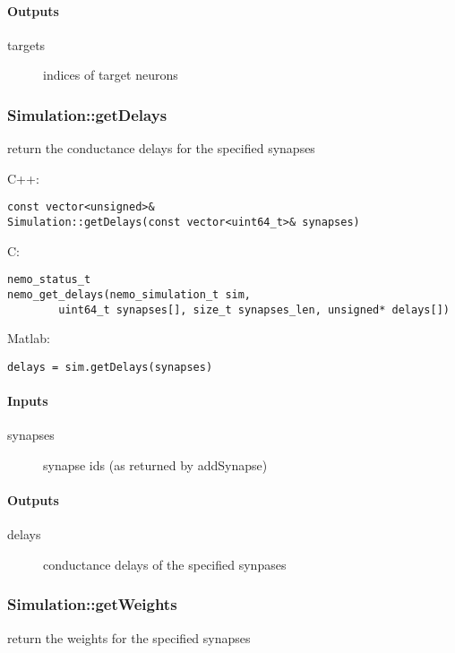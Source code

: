 \paragraph{Outputs}
\begin{description}
\item[targets] indices of target neurons
\end{description}

\clearpage
\subsubsection*{Simulation::getDelays}
\label{fn: getDelays}
return the conductance delays for the specified synapses


\noindent C++:
\begin{lstlisting}[aboveskip=2pt]
const vector<unsigned>&
Simulation::getDelays(const vector<uint64_t>& synapses)
\end{lstlisting}

\noindent C:
\begin{lstlisting}[aboveskip=2pt]
nemo_status_t
nemo_get_delays(nemo_simulation_t sim, 
        uint64_t synapses[], size_t synapses_len, unsigned* delays[])
\end{lstlisting}

\noindent Matlab:
\begin{lstlisting}[aboveskip=2pt]
delays = sim.getDelays(synapses)
\end{lstlisting}
\paragraph{Inputs}
\begin{description}
\item[synapses] synapse ids (as returned by addSynapse)
\end{description}
\paragraph{Outputs}
\begin{description}
\item[delays] conductance delays of the specified synpases
\end{description}

\clearpage
\subsubsection*{Simulation::getWeights}
\label{fn: getWeights}
return the weights for the specified synapses


